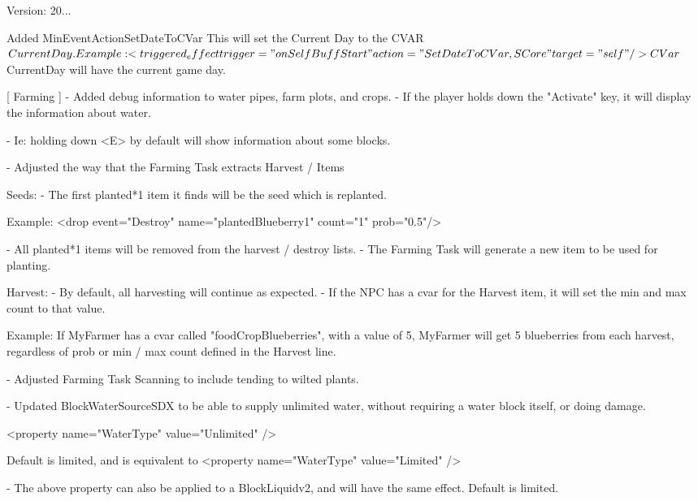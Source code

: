 Version\+: 20... \begin{DoxyVerb}[ MinEvent ]
    Added MinEventActionSetDateToCVar
        This will set the Current Day to the CVAR $CurrentDay.

        Example: 
            <triggered_effect trigger="onSelfBuffStart" action="SetDateToCVar, SCore" target="self"/> 

            CVar $CurrentDay will have the current game day.


[ Farming ]
    - Added debug information to water pipes, farm plots, and crops.
        - If the player holds down the "Activate" key, it will display the information about water.

        - Ie: holding down <E> by default will show information about some blocks.

    - Adjusted the way that the Farming Task extracts Harvest / Items

        Seeds:
            - The first planted*1 item it finds will be the seed which is replanted.

            Example:
                <drop event="Destroy" name="plantedBlueberry1" count="1" prob="0.5"/>

            - All planted*1 items will be removed from the harvest / destroy lists.
            - The Farming Task will generate a new item to be used for planting.

        Harvest:
            - By default, all harvesting will continue as expected. 
            - If the NPC has a cvar for the Harvest item, it will set the min and max count to that value.

            Example:
                If MyFarmer has a cvar called "foodCropBlueberries", with a value of 5, MyFarmer will get 5 blueberries from each harvest,
                    regardless of prob or min / max count defined in the Harvest line.

    - Adjusted Farming Task Scanning to include tending to wilted plants.

    - Updated BlockWaterSourceSDX to be able to supply unlimited water, without requiring a water block itself, or doing damage.

        <property name="WaterType" value="Unlimited" />

        Default is limited, and is equivalent to 
            <property name="WaterType" value="Limited" />

    - The above property can also be applied to a BlockLiquidv2, and will have the same effect.
        Default is limited.
\end{DoxyVerb}


